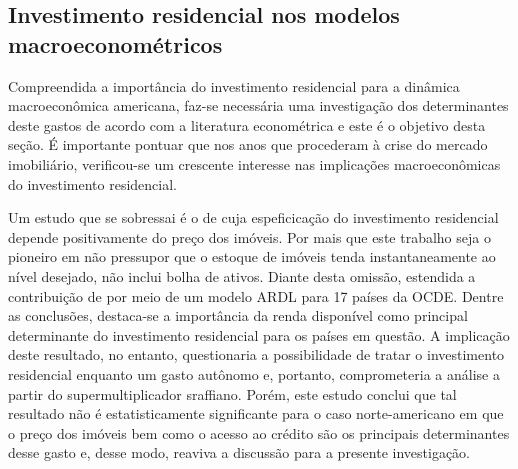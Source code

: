 \subsection{Investimento residencial nos modelos macroeconométricos}\label{RevEmpirica}

Compreendida a importância do investimento residencial para a dinâmica macroeconômica americana, faz-se necessária uma investigação dos determinantes deste gastos de acordo com a literatura econométrica e este é o objetivo desta seção. 
É importante pontuar que nos anos que procederam à crise do mercado imobiliário, verificou-se um crescente interesse nas implicações macroeconômicas do investimento residencial. 

Um estudo que se sobressai é o de \textcite{poterba_tax_1984}  cuja espeficicação do investimento residencial depende positivamente do preço dos imóveis. 
Por mais que este trabalho seja o pioneiro em não pressupor que o estoque de imóveis tenda instantaneamente ao nível desejado, não inclui bolha de ativos.
Diante desta omissão, 
\textcite{arestis_residential_2015} estendida a contribuição de 
\textcite{poterba_tax_1984} por meio de um modelo ARDL para 17 países da OCDE. 
Dentre as conclusões, destaca-se a importância da renda disponível como principal determinante do investimento residencial para os países em questão.  A implicação deste resultado, no entanto, questionaria a possibilidade de tratar o investimento residencial enquanto um gasto autônomo e, portanto, comprometeria a análise a partir do supermultiplicador sraffiano. Porém, este estudo conclui que tal resultado não é estatisticamente significante para o caso norte-americano em que o preço dos imóveis bem como o acesso ao crédito são os principais determinantes desse gasto e, desse modo, reaviva a discussão para a presente investigação.


